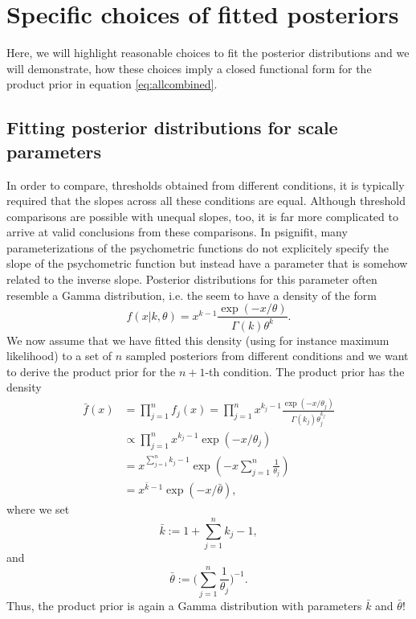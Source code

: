\documentclass[a4paper,11pt]{scrartcl}
\begin{document}
\section{Specific choices of fitted posteriors}

Here, we will highlight reasonable choices to fit the posterior distributions and we will demonstrate, how these choices imply a closed functional form for the product prior in equation \eqref{eq:allcombined}.

\subsection{Fitting posterior distributions for scale parameters}

In order to compare, thresholds obtained from different conditions, it is typically required that the slopes across all these conditions are equal.
Although threshold comparisons are possible with unequal slopes, too, it is far more complicated to arrive at valid conclusions from these comparisons.
In psignifit, many parameterizations of the psychometric functions do not explicitely specify the slope of the psychometric function but instead have a parameter that is somehow related to the inverse slope.
Posterior distributions for this parameter often resemble a Gamma distribution, i.e. the seem to have a density of the form
%
\begin{equation}
    \label{eq:GammaDensity}
    f ( x | k, \theta ) = x^{k-1} \frac{\exp(-x/\theta)}{\Gamma(k)\theta^k}.
\end{equation}
%
We now assume that we have fitted this density (using for instance maximum likelihood) to a set of $n$ sampled posteriors from different conditions and we want to derive the product prior for the $n+1$-th condition.
The product prior has the density
%
\begin{align*}
    \bar{f}(x) &= \prod_{j=1}^n f_j(x) = \prod_{j=1}^n x^{k_j-1} \frac{\exp(-x/\theta_j)}{\Gamma(k_j)\theta_j^{k_j}} \\
    &\propto \prod_{j=1}^n x^{k_j-1} \exp(-x/\theta_j) \\
    &= x^{\sum_{j=1}^n k_j-1} \exp(-x\sum_{j=1}^n \frac{1}{\theta_j}) \\
    &= x^{\bar{k}-1} \exp(-x/\bar{\theta}),
\end{align*}
%
where we set
%
$$
\bar{k} := 1 + \sum_{j=1}^n k_j-1,
$$
%
and
%
$$
\bar{\theta} := \Big( \sum_{j=1}^n \frac{1}{\theta_j} \Big)^{-1}.
$$
%
Thus, the product prior is again a Gamma distribution with parameters $\bar{k}$ and $\bar{\theta}$!
\end{document}
